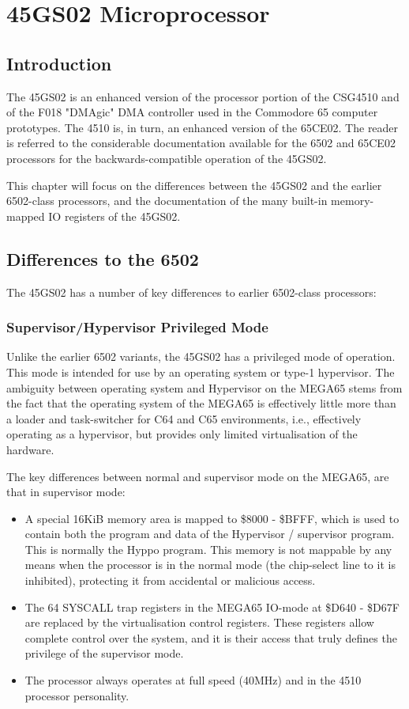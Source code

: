 \chapter{45GS02 Microprocessor}
\label{cha:cpu}
\label{cha:45gs02}
\section{Introduction}

The 45GS02 is an enhanced version of the processor portion of the CSG4510
and of the F018 "DMAgic" DMA controller used in the Commodore 65
computer prototypes.  The 4510 is, in turn,
an enhanced version of the 65CE02.
The reader is referred to
the considerable documentation available for the 6502 and 65CE02 processors
for the backwards-compatible operation of the 45GS02.

This chapter will
focus on the differences between the 45GS02 and the earlier 6502-class
processors, and the documentation of the many built-in memory-mapped IO
registers of the 45GS02.

\section{Differences to the 6502}

The 45GS02 has a number of key differences to earlier 6502-class processors:

\subsection{Supervisor/Hypervisor Privileged Mode}

Unlike the earlier 6502 variants, the 45GS02 has a privileged mode of operation.
This mode is intended for use by an operating system or type-1
hypervisor.  The ambiguity between
operating system and Hypervisor on the MEGA65 stems from the fact that the operating
system of the MEGA65 is effectively little more than a loader and
task-switcher for C64 and C65
environments, i.e., effectively operating as a hypervisor, but provides
only limited virtualisation
of the hardware.

The key differences between normal and supervisor mode on the MEGA65, are that in
supervisor mode:

\begin{itemize}
\item A special 16KiB memory area is mapped to \$8000 - \$BFFF, which is
 used to contain both
 the program and data of the Hypervisor / supervisor program.
 This is normally the Hyppo program.
  This memory is not mappable by any means when the processor is in the
 normal mode (the chip-select
  line to it is inhibited), protecting it from accidental or malicious access.
\item The 64 SYSCALL trap registers in the MEGA65 IO-mode at
\$D640 - \$D67F are replaced by the
  virtualisation control registers.  These registers allow complete
control over the system, and
  it is their access that truly defines the privilege of the supervisor mode.
  \item The processor always operates at full speed (40MHz) and in the
 4510 processor personality.
\end{itemize}

